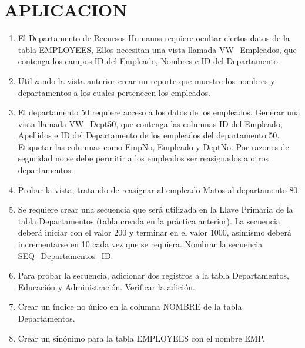 \section{APLICACION} 
		
\begin{enumerate}[1.]
	\item El Departamento de Recursos Humanos requiere ocultar ciertos datos de la tabla EMPLOYEES, Ellos necesitan una vista llamada VW\_Empleados, que contenga los campos ID del Empleado, Nombres e ID del Departamento.
	\item Utilizando la vista anterior crear un reporte que muestre los nombres y departamentos a los cuales
pertenecen los empleados.
	\item El departamento 50 requiere acceso a los datos de los empleados. Generar una vista llamada VW\_Dept50, que contenga las columnas ID del Empleado, Apellidos e ID del Departamento de los empleados del departamento 50. Etiquetar las columnas como EmpNo, Empleado y DeptNo. Por razones de seguridad no se debe permitir a los empleados ser reasignados a otros departamentos.
	\item Probar la vista, tratando de reasignar al empleado Matos al departamento 80.
	\item Se requiere crear una secuencia que será utilizada en la Llave Primaria de la tabla Departamentos (tabla creada en la práctica anterior). La secuencia deberá iniciar con el valor 200 y terminar en el valor 1000, asimismo deberá incrementarse en 10 cada vez que se requiera. Nombrar la secuencia SEQ\_Departamentos\_ID.
	\item Para probar la secuencia, adicionar dos registros a la tabla Departamentos, Educación y Administración. Verificar la adición.
	\item Crear un índice no único en la columna NOMBRE de la tabla Departamentos.
	\item Crear un sinónimo para la tabla EMPLOYEES con el nombre EMP.
\end{enumerate}

